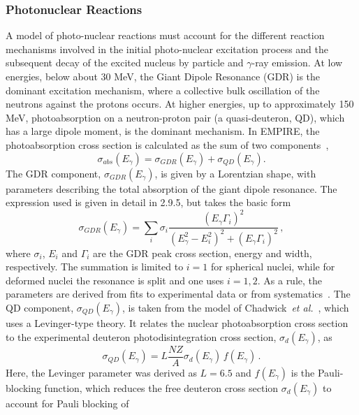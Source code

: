 \documentclass[twocolumn,amsmath,amssymb,10pt,groupedaddress,letter]{revtex4}
\begin{document}
\subsubsection{\label{sec:photonuclear} Photonuclear Reactions}
A model of photo-nuclear reactions must account for the different reaction
mechanisms involved in the initial photo-nuclear excitation process
and the subsequent decay of the excited nucleus by particle and $\gamma$-ray
emission. At low energies, below about 30 MeV, the Giant Dipole Resonance
(GDR) is the dominant excitation mechanism, where a collective bulk
oscillation of the neutrons against the protons occurs. At higher
energies, up to approximately 150 MeV, photoabsorption on a neutron-proton
pair (a quasi-deuteron, QD), which has a large dipole moment, is the
dominant mechanism.
In EMPIRE, the photoabsorption cross section is calculated as the
sum of two components~\cite{PHNuc},
\begin{equation}
\sigma_{abs}(E_{\gamma})=\sigma_{GDR}(E_{\gamma})+\sigma_{QD}(E_{\gamma}).
\end{equation}
The GDR component, $\sigma_{GDR}(E_{\gamma})$, is given by a Lorentzian
shape, with parameters describing the total absorption of the giant
dipole resonance. The expression used is given in detail in 2.9.5,
but takes the basic form
\begin{equation}
\sigma_{GDR}(E_{\gamma})=\sum_{i}\sigma_{i}\frac{(E_{\gamma}\Gamma_{i})^{2}}{(E_{\gamma}^{2}-E_{i}^{2})^{2}+(E_{\gamma}\Gamma_{i})^{2}}\,,
\end{equation}
\noindent where $\sigma_{i}$, $E_{i}$ and $\Gamma_{i}$ are the GDR peak cross
section, energy and width, respectively. The summation is limited
to $i=1$ for spherical nuclei, while for deformed nuclei the resonance
is split and one uses $i=1,2$. As a rule, the parameters are derived
from fits to experimental data or from systematics~\cite{RIPL2}.
The QD component, $\sigma_{QD}(E_{\gamma})$, is taken from the model
of Chadwick~\emph{et al.}~\cite{chadQD}, which uses a Levinger-type
theory. It relates the nuclear photoabsorption cross section to the
experimental deuteron photodisintegration cross section, $\sigma_{d}(E_{\gamma})$,
as
\begin{equation}
\sigma_{QD}(E_{\gamma})=L\frac{NZ}{A}\sigma_{d}(E_{\gamma})\, f(E_{\gamma})\,.
\end{equation}
Here, the Levinger parameter was derived as $L=6.5$ and $f(E_{\gamma})$
is the Pauli-blocking function, which reduces the free deuteron cross
section $\sigma_{d}(E_{\gamma})$ to account for Pauli blocking of
\end{document}
